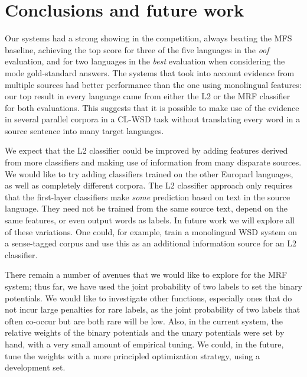 \documentclass[11pt,letterpaper]{article}
\begin{document}
\section{Conclusions and future work}
Our systems had a strong showing in the competition, always beating the MFS
baseline, achieving the top score for three of the five languages in the
\emph{oof} evaluation, and for two languages in the \emph{best} evaluation when
considering the mode gold-standard answers. The systems that took into account
evidence from multiple sources had better performance than the one using
monolingual features: our top result in every language came from either the L2
or the MRF classifier for both evaluations. This suggests that it is possible
to make use of the evidence in several parallel corpora in a CL-WSD task
without translating every word in a source sentence into many target languages.

We expect that the L2 classifier could be improved by adding features derived
from more classifiers and making use of information from many disparate
sources. We would like to try adding classifiers trained on the other Europarl
languages, as well as completely different corpora. The L2 classifier approach
only requires that the first-layer classifiers make \emph{some} prediction
based on text in the source language.  They need not be trained from the same
source text, depend on the same features, or even output words as labels. In
future work we will explore all of these variations. One could, for example,
train a monolingual WSD system on a sense-tagged corpus and use this as an
additional information source for an L2 classifier.


There remain a number of avenues that we would like to explore for the MRF
system; thus far, we have used the joint probability of two labels to set the
binary potentials. We would like to investigate other functions, especially
ones that do not incur large penalties for rare labels, as the joint
probability of two labels that often co-occur but are both rare will be low.
Also, in the current system, the relative weights of the binary potentials and
the unary potentials were set by hand, with a very small amount of empirical
tuning. We could, in the future, tune the weights with a more principled
optimization strategy, using a development set.
\end{document}
